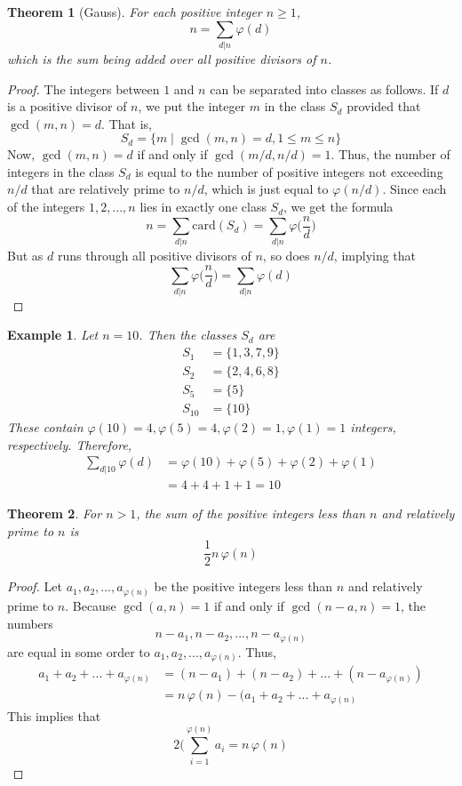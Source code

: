 \documentclass{article}
\newtheorem{theorem}{Theorem}[section]
\newtheorem{example}{Example}[section]
\theoremstyle{remark}
\theoremstyle{definition}
\begin{document}
\begin{theorem}[Gauss]
For each positive integer $n \geq 1$, 
\[n = \sum_{d|n} \varphi(d)\]
which is the sum being added over all positive divisors of $n$. 
\end{theorem}
\begin{proof}
The integers between $1$ and $n$ can be separated into classes as follows. If $d$ is a positive divisor of $n$, we put the integer $m$ in the class $S_d$ provided that $\gcd(m, n) = d$. That is, 
\[S_d = \{m\;|\; \gcd(m, n) = d, 1 \leq m \leq n\}\]
Now, $\gcd(m, n) = d$ if and only if $\gcd(m/d, n/d) = 1$. Thus, the number of integers in the class $S_d$ is equal to the number of positive integers not exceeding $n/d$ that are relatively prime to $n/d$, which is just equal to $\varphi(n/d)$. Since each of the integers $1, 2, ..., n$ lies in exactly one class $S_d$, we get the formula
\[n = \sum_{d|n} \text{card}(S_d) = \sum_{d|n} \varphi \bigg(\frac{n}{d} \bigg)\]
But as $d$ runs through all positive divisors of $n$, so does $n/d$, implying that
\[\sum_{d|n} \varphi \bigg( \frac{n}{d} \bigg) = \sum_{d|n} \varphi (d)\]
\end{proof}

\begin{example}
Let $n=10$. Then the classes $S_d$ are 
\begin{align*}
    S_1 & = \{1, 3, 7, 9\} \\
    S_2 & = \{2, 4, 6, 8\} \\
    S_5 & = \{5\} \\
    S_{10} & = \{10\}
\end{align*}
These contain $\varphi(10) = 4, \varphi(5) = 4, \varphi(2) = 1, \varphi(1) = 1$ integers, respectively. Therefore, 
\begin{align*}
    \sum_{d|10} \varphi(d) & = \varphi(10) + \varphi(5) + \varphi(2) + \varphi(1) \\
    & = 4 + 4 + 1 + 1 = 10 
\end{align*}
\end{example}

\begin{theorem}
For $n>1$, the sum of the positive integers less than $n$ and relatively prime to $n$ is
\[\frac{1}{2} n \,\varphi(n)\]
\end{theorem}
\begin{proof}
Let $a_1, a_2, ..., a_{\varphi(n)}$ be the positive integers less than $n$ and relatively prime to $n$. Because $\gcd(a, n) = 1$ if and only if $\gcd(n-a, n) = 1$, the numbers
\[n-a_1, n-a_2, ..., n - a_{\varphi(n)}\]
are equal in some order to $a_1, a_2, ..., a_{\varphi(n)}$. Thus, 
\begin{align*}
    a_1 + a_2 + ... + a_{\varphi(n)} & = (n- a_1) + (n - a_2) + ... + (n - a_{\varphi(n)}) \\
    & = n\,\varphi(n) - (a_1 + a_2 + ... + a_{\varphi(n)}
\end{align*}
This implies that 
\[2 (\sum_{i=1}^{\varphi(n)} a_i = n\, \varphi(n)\]
\end{proof}
\end{document}
